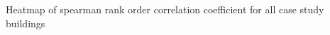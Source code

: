 Heatmap of spearman rank order correlation coefficient for all case study buildings
\label{fig:spearman_heatmap}